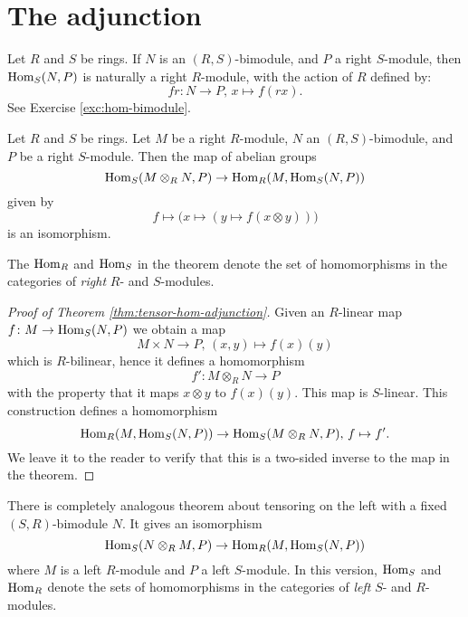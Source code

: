 \section{The adjunction}

Let $R$ and $S$ be rings. If $N$ is an $(R,S)$-bimodule, and $P$ a right $S$-module, then $\operatorname{Hom}_S(N,P)$ is naturally a right $R$-module, with the action of $R$ defined by:
\[
	fr\colon N \to P,\, x \mapsto f(rx).
\]
See Exercise \ref{exc:hom-bimodule}.


\begin{theorem}\label{thm:tensor-hom-adjunction}
Let $R$ and $S$ be rings. Let $M$ be a right $R$-module, $N$ an $(R,S)$-bimodule, and $P$ be a right $S$-module. Then the map of abelian groups
\[
	\operatorname{Hom}_S(M\otimes_R N, P) \to \operatorname{Hom}_R(M,\operatorname{Hom}_S(N,P))
\]
given by
\[
	f \mapsto \big( x \mapsto ( y \mapsto f(x\otimes y) )\big)
\]
is an isomorphism.
\end{theorem}

\begin{remark}
The $\operatorname{Hom}_R$ and $\operatorname{Hom}_S$ in the theorem denote the set of homomorphisms in the categories of \emph{right} $R$- and $S$-modules. 
\end{remark}


\begin{proof}[Proof of Theorem \ref{thm:tensor-hom-adjunction}]
Given an $R$-linear map $f\colon M\to \operatorname{Hom}_S(N,P)$ we obtain a map
\[
	M\times N \to P,\,  (x,y) \mapsto f(x)(y)
\]
which is $R$-bilinear, hence it defines a homomorphism
\[
	f'\colon M\otimes_R N \to P
\]
with the property that it maps $x\otimes y$ to $f(x)(y)$. This map is $S$-linear. This construction defines a homomorphism 
\[
	\operatorname{Hom}_R(M,\operatorname{Hom}_S(N,P)) \to \operatorname{Hom}_S(M\otimes_R N, P),\, f\mapsto f'.
\]
We leave it to the reader to verify that this is a two-sided inverse to the map in the theorem.
\end{proof}

\begin{remark}\label{thm:alternate-adjunction}
There is completely analogous theorem about tensoring on the left with a fixed $(S,R)$-bimodule $N$. It gives an isomorphism
\[
	\operatorname{Hom}_S(N\otimes_R M, P) \to \operatorname{Hom}_R(M, \operatorname{Hom}_S(N,P))
\]
where $M$ is a left $R$-module and $P$ a left $S$-module. In this version, $\operatorname{Hom}_S$ and $\operatorname{Hom}_R$ denote the sets of homomorphisms in the categories of \emph{left} $S$- and $R$-modules.
\end{remark}

